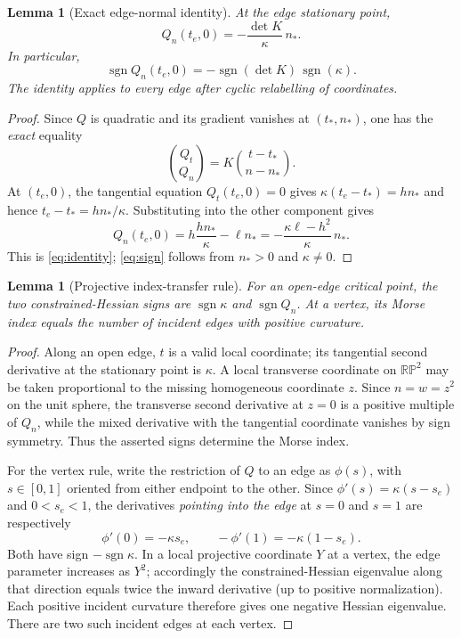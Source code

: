 \documentclass[10pt,a4paper]{article}
\theoremstyle{plain}
\newtheorem{lemma}[theorem]{Lemma}
\theoremstyle{remark}
\newcommand{\RP}{\mathbb{RP}}
\newcommand{\sgn}{\operatorname{sgn}}
\begin{document}
\begin{lemma}[Exact edge-normal identity]\label{lem:edge}
At the edge stationary point,
\begin{equation}\label{eq:identity}
 Q_n(t_e,0)=-\frac{\det K}{\kappa}\,n_*.
\end{equation}
In particular,
\begin{equation}\label{eq:sign}
 \sgn Q_n(t_e,0)=-\sgn(\det K)\,\sgn(\kappa).
\end{equation}
The identity applies to every edge after cyclic relabelling of coordinates.
\end{lemma}
\begin{proof}
Since $Q$ is quadratic and its gradient vanishes at $(t_*,n_*)$, one has the \emph{exact} equality
\[
 \binom{Q_t}{Q_n}=K\binom{t-t_*}{n-n_*}.
\]
At $(t_e,0)$, the tangential equation $Q_t(t_e,0)=0$ gives $\kappa(t_e-t_*)=hn_*$ and hence $t_e-t_*=hn_*/\kappa$. Substituting into the other component gives
\[
 Q_n(t_e,0)=h\frac{h n_*}{\kappa}-\ell n_*
 =-\frac{\kappa\ell-h^2}{\kappa}\,n_*.
\]
This is \eqref{eq:identity}; \eqref{eq:sign} follows from $n_*>0$ and $\kappa\ne0$.
\end{proof}

\begin{lemma}[Projective index-transfer rule]\label{lem:index}
For an open-edge critical point, the two constrained-Hessian signs are $\sgn\kappa$ and $\sgn Q_n$. At a vertex, its Morse index equals the number of incident edges with positive curvature.
\end{lemma}
\begin{proof}
Along an open edge, $t$ is a valid local coordinate; its tangential second derivative at the stationary point is $\kappa$. A local transverse coordinate on $\RP^2$ may be taken proportional to the missing homogeneous coordinate $z$. Since $n=w=z^2$ on the unit sphere, the transverse second derivative at $z=0$ is a positive multiple of $Q_n$, while the mixed derivative with the tangential coordinate vanishes by sign symmetry. Thus the asserted signs determine the Morse index.

For the vertex rule, write the restriction of $Q$ to an edge as $\phi(s)$, with $s\in[0,1]$ oriented from either endpoint to the other. Since $\phi'(s)=\kappa(s-s_e)$ and $0<s_e<1$, the derivatives \emph{pointing into the edge} at $s=0$ and $s=1$ are respectively
\[
 \phi'(0)=-\kappa s_e,\qquad -\phi'(1)=-\kappa(1-s_e).
\]
Both have sign $-\sgn\kappa$. In a local projective coordinate $Y$ at a vertex, the edge parameter increases as $Y^2$; accordingly the constrained-Hessian eigenvalue along that direction equals twice the inward derivative (up to positive normalization). Each positive incident curvature therefore gives one negative Hessian eigenvalue. There are two such incident edges at each vertex.
\end{proof}
\end{document}
